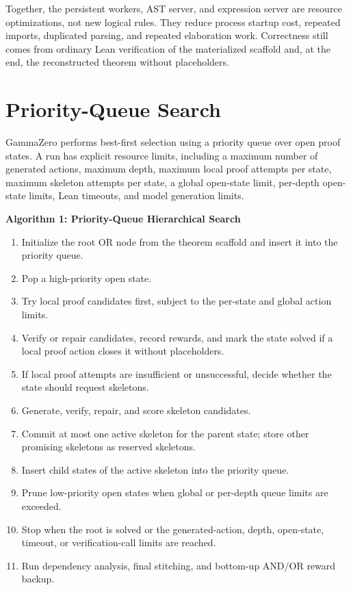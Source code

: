 Together, the persistent workers, AST server, and expression server are resource optimizations, not new
logical rules. They reduce process startup cost, repeated imports, duplicated parsing, and repeated
elaboration work. Correctness still comes from ordinary Lean verification of the materialized scaffold
and, at the end, the reconstructed theorem without placeholders.

\section{Priority-Queue Search}

GammaZero performs best-first selection using a priority queue over open proof states. A run has explicit resource limits, including a maximum number of generated actions, maximum depth, maximum local proof attempts per state, maximum skeleton attempts per state, a global open-state limit, per-depth open-state limits, Lean timeouts, and model generation limits.

\noindent\textbf{Algorithm 1: Priority-Queue Hierarchical Search}
\begin{enumerate}[leftmargin=*]
    \item Initialize the root OR node from the theorem scaffold and insert it into the priority queue.
    \item Pop a high-priority open state.
    \item Try local proof candidates first, subject to the per-state and global action limits.
    \item Verify or repair candidates, record rewards, and mark the state solved if a local proof action closes it without placeholders.
    \item If local proof attempts are insufficient or unsuccessful, decide whether the state should request skeletons.
    \item Generate, verify, repair, and score skeleton candidates.
    \item Commit at most one active skeleton for the parent state; store other promising skeletons as reserved skeletons.
    \item Insert child states of the active skeleton into the priority queue.
    \item Prune low-priority open states when global or per-depth queue limits are exceeded.
    \item Stop when the root is solved or the generated-action, depth, open-state, timeout, or verification-call limits are reached.
    \item Run dependency analysis, final stitching, and bottom-up AND/OR reward backup.
\end{enumerate}

